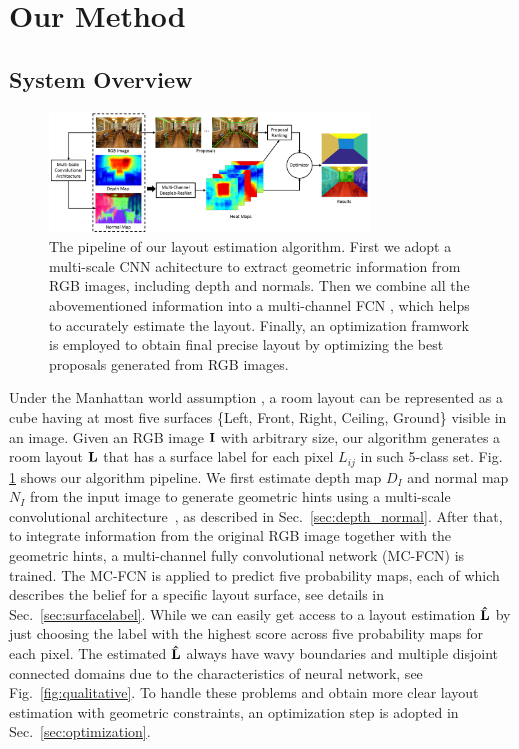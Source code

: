 \section{Our Method}
\label{sec:Meth}


\subsection{System Overview}
\label{subsection:overview}

\begin{figure}[!ht]
	\centering
	\includegraphics[width=8.5cm]{figure/ppline.png}
	\caption{The pipeline of our layout estimation algorithm. First we adopt a multi-scale CNN achitecture \cite{eigen2015predicting} to extract geometric information from RGB images, including depth and normals. Then we combine all the abovementioned information into a multi-channel FCN , which helps to accurately estimate the layout. Finally, an optimization framwork is employed to obtain final precise layout by optimizing the best proposals generated from RGB images.}
	\label{fig:pipeline}
\end{figure}

Under the Manhattan world assumption \cite{coughlan1999manhattan}, a room layout can be represented as a cube having at most five surfaces \{Left, Front, Right, Ceiling, Ground\} visible in an image. 
%
Given an RGB image $\mathbf{I}$ with arbitrary size, our algorithm generates a room layout $\mathbf{L}$ that has a surface label for each pixel $L_{ij} $ in such 5-class set. Fig. \ref{fig:pipeline} shows our algorithm pipeline. 
We first estimate depth map $D_{I}$ and normal map $N_{I}$ from the input image to generate geometric hints using a multi-scale convolutional architecture~\cite{eigen2015predicting}, as described in Sec.~\ref{sec:depth_normal}.
After that, to integrate information from the original RGB image together with the geometric hints, a multi-channel fully convolutional network (MC-FCN) is trained. The MC-FCN is applied to predict five probability maps, each of which describes the belief for a specific layout surface, see details in Sec.~\ref{sec:surfacelabel}.
While we can easily get access to a layout estimation $\mathbf{\hat{L}}$ by just choosing the label with the highest score across five probability maps for each pixel. 
The estimated $\mathbf{\hat{L}}$ always have wavy boundaries and multiple disjoint connected domains due to the characteristics of neural network, see Fig.~\ref{fig:qualitative}. To handle these problems and obtain more clear layout estimation with geometric constraints, an optimization step is adopted in Sec.~\ref{sec:optimization}.  
 

